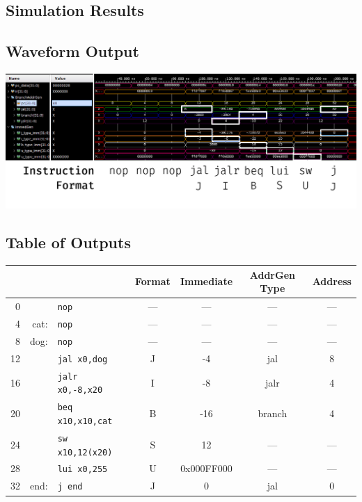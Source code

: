 \documentclass{article}
\begin{document}
\begin{landscape}
\section{Simulation Results}
\subsection{Waveform Output}
\includegraphics[width=\linewidth]{wer.png}

\subsection{Table of Outputs}
\centering
\begin{tabular}{r | r l || c | c || c | c }
    &&& \textbf{Format} & \textbf{Immediate} & \textbf{AddrGen Type} & \textbf{Address} \\
    \hline
    0  & & \texttt{nop} & --- & --- & --- & --- \\
    4  & cat: & \texttt{nop} & --- & --- & --- & --- \\
    8  & dog: & \texttt{nop} & ---& --- & --- & --- \\
    12 & & \texttt{jal    x0,dog       } & J & -4 & jal & 8 \\
    16 & & \texttt{jalr   x0,-8,x20    } & I & -8 & jalr & 4 \\
    20 & & \texttt{beq    x10,x10,cat  } & B & -16 & branch & 4 \\
    24 & & \texttt{sw     x10,12(x20)  } & S & 12 & --- & --- \\
    28 & & \texttt{lui    x0,255       } & U & 0x000FF000 & --- & ---\\
    32 & end:& \texttt{j      end}       & J & 0 & jal & 0 \\
\end{tabular}
\end{landscape}
    
\end{document}
